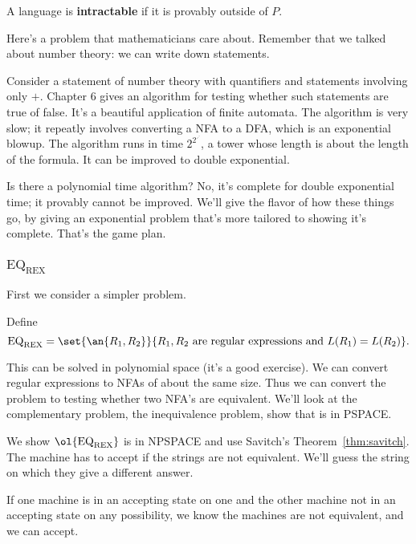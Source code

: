\begin{df}
A language is \textbf{intractable} if it is provably outside of $P$.
\end{df}
\begin{ex}
Here's a problem that mathematicians care about. Remember that we talked about number theory: we can write down statements. 

Consider a statement of number theory with quantifiers and  statements involving only $+$.  
Chapter 6 gives an algorithm for testing whether such statements are true of false. It's a beautiful application of finite automata. The algorithm is very slow; it repeatly involves converting a NFA to a DFA, which is an exponential blowup.
The algorithm runs in time $2^{2^{\iddots}}$, a tower whose length is about the length of the formula. It can be improved to double exponential.

Is there a polynomial time algorithm? No, it's complete for double exponential time; it provably cannot be improved. We'll give the flavor of how these things go, by giving an exponential problem that's more tailored to showing it's complete.
That's the game plan.

\subsubsection{$\text{EQ}_{\text{REX}}$}

First we consider a simpler problem.
\end{ex} 
\begin{df}
Define
\[
\text{EQ}_{\text{REX}}=\set{
\an{R_1,R_2}
}{R_1,R_2\text{ are regular expressions and }L(R_1)=L(R_2)}.
\]
\end{df}
This can be solved in polynomial space (it's a good exercise). We can convert regular expressions to NFAs of about the same size. Thus we can convert the problem to testing whether two NFA's are equivalent. %
We'll look at the complementary problem, the inequivalence problem, show that is in PSPACE.

We show $\ol{\text{EQ}_{\text{REX}}}$ is in NPSPACE and use Savitch's Theorem~\ref{thm:savitch}. The machine has to accept if the strings are not equivalent. We'll guess the string on which they give a different answer.

If one machine is in an accepting state on one and the other machine not in an accepting state on any possibility, we know the machines are not equivalent, and we can accept. %

